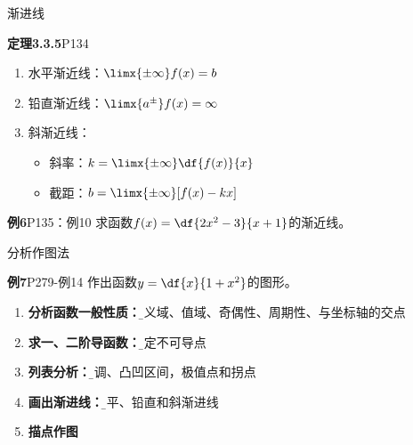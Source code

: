 \begin{frame}{渐进线}
	\linespread{1}\pause
	\vspace{-1ex}
	\begin{block}{{\bf 定理3.3.5}\hfill P134}
		\begin{enumerate}\pause
		  \item {\bb 水平渐近线：}$\limx{\pm\infty}f(x)=b$\pause
		  \item {\bb 铅直渐近线：}$\limx{a^{\pm}}f(x)=\infty$\pause
		  \item {\bb 斜渐近线：}\pause
		  \begin{itemize}
		    \item 斜率：$k=\limx{\pm\infty}\df{f(x)}{x}$\pause
		    \item 截距：$b=\limx{\pm\infty}[f(x)-kx]$
		  \end{itemize}
		\end{enumerate}
	\end{block}\pause
	\vspace{-1ex}
	\begin{exampleblock}{{\bf 例6}\hfill P135：例10}
		求函数$f(x)=\df{2x^2-3}{x+1}$的渐近线。
	\end{exampleblock}
\end{frame}

\begin{frame}[t]{分析作图法}
	\linespread{1.2}\pause
	\begin{exampleblock}{{\bf 例7}\hfill P279-例14}
		作出函数$y=\df{x}{1+x^2}$的图形。
	\end{exampleblock}\pause
	
	\begin{enumerate}
	  \item {\bf 分析函数一般性质：}{\b 定义域、值域、奇偶性、周期性、与坐标轴的交点}\pause
	  \item {\bf 求一、二阶导函数：}{\b 确定不可导点}\pause
	  \item {\bf 列表分析：}{\b 单调、凸凹区间，极值点和拐点}\pause
	  \item {\bf 画出渐进线：}{\b 水平、铅直和斜渐进线}\pause
	  \item {\bf 描点作图}
	\end{enumerate}
\end{frame}

